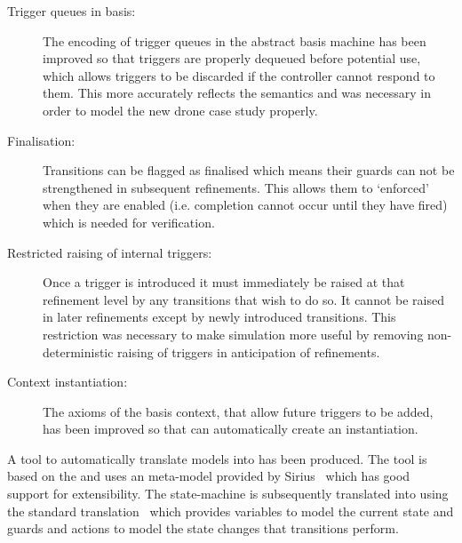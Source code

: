 \begin{description}
\item[Trigger queues in basis:]
  \begin{sloppypar}
    The encoding of trigger queues in the abstract basis machine has been improved so that triggers are properly dequeued before potential use,
    which allows triggers to be discarded if the controller cannot respond to them. 
    This more accurately reflects the \SCXML semantics and was necessary in order to model the new drone case study properly.
  \end{sloppypar}

\item[Finalisation:] Transitions can be flagged as finalised which means their guards can not be strengthened in subsequent refinements. This allows them to `enforced' when they are enabled (i.e. completion cannot occur until they have fired) which is needed for verification. 

\item[Restricted raising of internal triggers:] Once a trigger is introduced it must immediately be raised at that refinement level by any transitions that wish to do so. It cannot be raised in later refinements except by newly introduced transitions. This restriction was necessary to make simulation more useful by removing non-deterministic raising of triggers in anticipation of refinements.

\item[Context instantiation:] The axioms of the basis context, that allow future triggers to be added, has been improved so that \PROB can automatically create an instantiation. 

\end{description}

A tool to automatically translate \SCXML models into \UMLB has been produced. 
The tool is based on the \EMF and uses an \SCXML meta-model provided by Sirius~\cite{siriuswebsite} which has good support for extensibility. 
The \UMLB state-machine is subsequently translated into \EVENTB using the standard \UMLB translation~\cite{snook14:_b_statem} which provides variables to model the current state and guards and actions to model the state changes that transitions perform.

